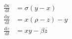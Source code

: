 \documentclass[preview]{standalone}
\begin{document}
\begin{center}
\[
            \begin{aligned}
            \frac{\mathrm{d} \text{x}}{\mathrm{~d} {t}} & = \sigma ({y} - {x}) \\
            \frac{\mathrm{d} {y}}{\mathrm{~d} {t}} & = {x} (\rho - {z}) - {y} \\
            \frac{\mathrm{d} {z}}{\mathrm{~d} {t}} & = {x} {y} - \beta {z}
            \end{aligned}
            \]
\end{center}
\end{document}
